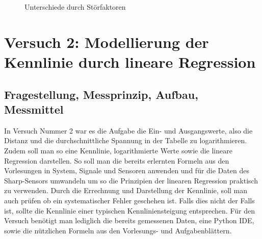 \documentclass[12pt, oneside, a4paper, \docLanguage]{report}
\begin{document}
\begin{figure}[hbt!]
  	\centering
  	\hfill
	\caption{Unterschiede durch Störfaktoren}
\end{figure}

%
%
\chapter{Versuch 2: Modellierung der Kennlinie durch lineare Regression}
\label{chap:VERSUCH_2}

\section{Fragestellung, Messprinzip, Aufbau, Messmittel}
\label{chap:VERSUCH_2_FRAGESTELLUNG}
In Versuch Nummer 2 war es die Aufgabe die Ein- und Ausgangswerte, also die Distanz und die durchschnittliche Spannung in der Tabelle zu logarithmieren.
\newline
Zudem soll man so eine Kennlinie, logarithmierte Werte sowie die lineare Regression darstellen.
\newline
So soll man die bereits erlernten Formeln aus den Vorlesungen in System, Signale und Sensoren anwenden und für die Daten des Sharp-Sensors umwandeln um so die Prinzipien der linearen Regression praktisch zu verwenden.
\newline
Durch die Errechnung und Darstellung der Kennlinie, soll man auch prüfen ob ein systematischer Fehler geschehen ist. Falls dies nicht der Falls ist, sollte die Kennlinie einer typischen Kennliniensteigung entsprechen.
\newline
Für den Versuch benötigt man lediglich die bereits gemessenen Daten, eine Python IDE, sowie die nützlichen Formeln aus den Vorlesungs- und Aufgabenblättern.
\newpage
\end{document}
